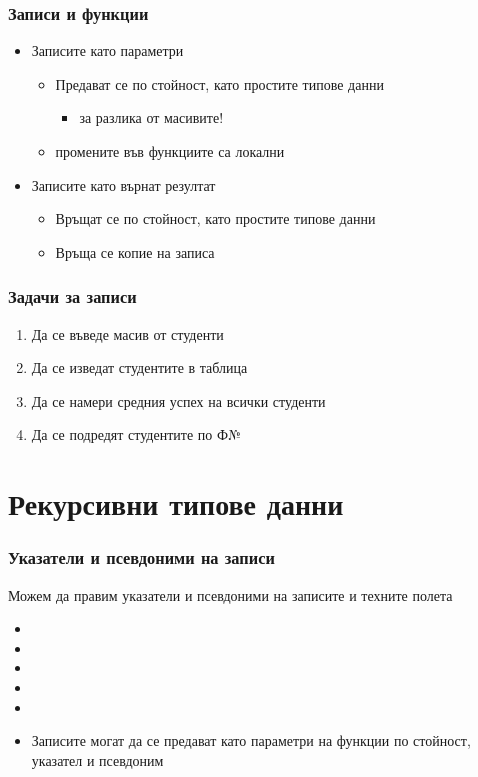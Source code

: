 \documentclass{beamer}
\begin{document}
\begin{frame}
  \frametitle{Записи и функции}

  \begin{itemize}[<+->]
  \item Записите като параметри
    \begin{itemize}
    \item Предават се \alert{по стойност}, като простите типове данни
      \begin{itemize}
      \item за разлика от масивите!
      \end{itemize}
    \item промените във функциите са локални
    \end{itemize}
  \item Записите като върнат резултат
    \begin{itemize}
    \item Връщат се \alert{по стойност}, като простите типове данни
    \item Връща се копие на записа
    \end{itemize}
  \end{itemize}
\end{frame}

\begin{frame}
  \frametitle{Задачи за записи}

  \begin{enumerate}[<+->]
  \item Да се въведе масив от студенти
  \item Да се изведат студентите в таблица
  \item Да се намери средния успех на всички студенти
  \item Да се подредят студентите по Ф№
  \end{enumerate}
\end{frame}

\section{Рекурсивни типове данни}

\begin{frame}
  \frametitle{Указатели и псевдоними на записи}

  Можем да правим указатели и псевдоними на записите и техните полета

  \begin{itemize}[<+->]
  \item {}
  \item {}
  \item {}
  \item {}
  \item {}
  \item Записите могат да се предават като параметри на функции по стойност, указател и псевдоним
  \end{itemize}
\end{frame}
\end{document}
